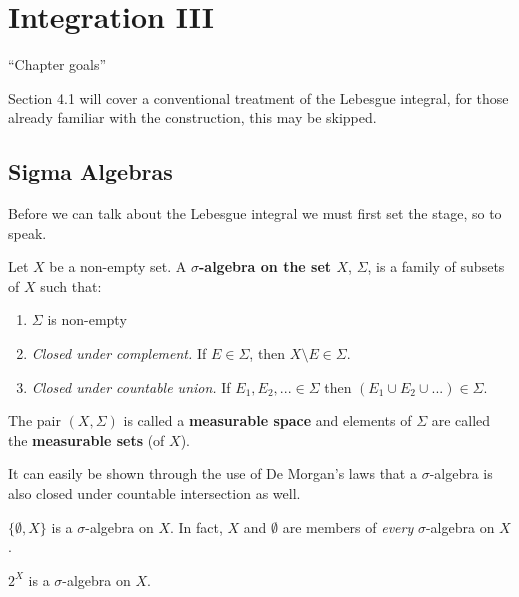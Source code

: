 \def\ind[#1]{\mathbb{I}_{#1}}
\def\extendedreal{\bar{\mathbb{R}}}
\def\hsetover[#1]{\mathbb{Z}^{#1}}

\chapter{Integration III} \label{integration}
\doublespacing

``Chapter goals''

Section 4.1 will cover a conventional treatment of the Lebesgue integral, for those already familiar with the construction, this may be skipped. 

%
%

\section{Sigma Algebras}

Before we can talk about the Lebesgue integral we must first set the stage, so to speak.



\begin{definition}
Let $X$ be a non-empty set. A \textbf{$\sigma$-algebra on the set $X$}, $\Sigma$,  is a family of subsets of $X$ such that:
\begin{enumerate}
\item $\Sigma$ is non-empty
\item \emph{Closed under complement.} If $E \in \Sigma$, then $X \setminus E \in \Sigma$.
\item \emph{Closed under countable union.} If $E_1, E_2, ... \in \Sigma$ then $(E_1 \cup E_2 \cup ... ) \in \Sigma$.
\end{enumerate}
The pair $(X, \Sigma)$ is called a \textbf{measurable space} and elements of $\Sigma$ are called the \textbf{measurable sets} (of $X$).
\end{definition}

It can easily be shown through the use of De Morgan's laws that a $\sigma$-algebra is also closed under countable intersection as well.
\begin{example}
$\{ \emptyset, X \}$ is a $\sigma$-algebra on $X$. In fact, $X$ and $\emptyset$ are members of \emph{every} $\sigma$-algebra on $X$.
\end{example}

\begin{example}
$2^X$ is a $\sigma$-algebra on $X$.
\end{example}

